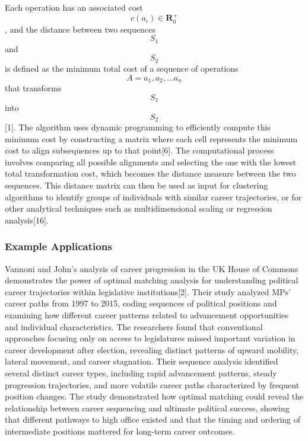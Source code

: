 \documentclass[./main.tex]{subfiles}
\begin{document}
Each operation has an associated cost
\[c(a_{i})\in \mathbf{R}_{0}^{+}\], and the distance between two
sequences \[S_{1}\] and \[S_{2}\] is defined as the minimum total cost
of a sequence of operations \[A={a_{1},a_{2},\ldots a_{n}}\] that
transforms \[S_{1}\] into \[S_{2}\]{[}1{]}. The algorithm uses dynamic
programming to efficiently compute this minimum cost by constructing a
matrix where each cell represents the minimum cost to align subsequences
up to that point{[}6{]}. The computational process involves comparing
all possible alignments and selecting the one with the lowest total
transformation cost, which becomes the distance measure between the two
sequences. This distance matrix can then be used as input for clustering
algorithms to identify groups of individuals with similar career
trajectories, or for other analytical techniques such as
multidimensional scaling or regression analysis{[}16{]}.

\subsubsection{Example Applications}\label{example-applications}

Vannoni and John's analysis of career progression in the UK House of
Commons demonstrates the power of optimal matching analysis for
understanding political career trajectories within legislative
institutions{[}2{]}. Their study analyzed MPs' career paths from 1997 to
2015, coding sequences of political positions and examining how
different career patterns related to advancement opportunities and
individual characteristics. The researchers found that conventional
approaches focusing only on access to legislatures missed important
variation in career development after election, revealing distinct
patterns of upward mobility, lateral movement, and career stagnation.
Their sequence analysis identified several distinct career types,
including rapid advancement patterns, steady progression trajectories,
and more volatile career paths characterized by frequent position
changes. The study demonstrated how optimal matching could reveal the
relationship between career sequencing and ultimate political success,
showing that different pathways to high office existed and that the
timing and ordering of intermediate positions mattered for long-term
career outcomes.
\end{document}
